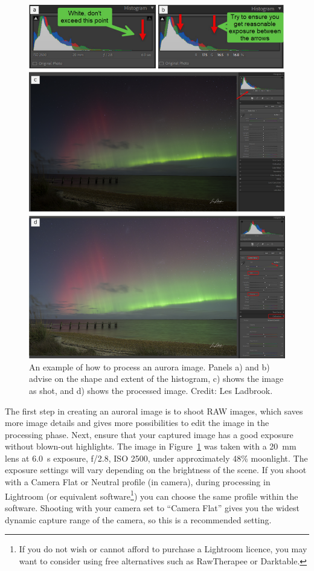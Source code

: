 \documentclass{article}
\begin{document}
\begin{figure}
  \includegraphics[width=\linewidth]{Fig14_ImageHistograms.png}
  \caption{An example of how to process an aurora image. Panels a) and b) advise on the shape and extent of the histogram, c) shows the image as shot, and d) shows the processed image. Credit: Les Ladbrook.}
  \label{fig-processing}
\end{figure}

The first step in creating an auroral image is to shoot RAW images, which saves more image details and gives more possibilities to edit the image in the processing phase. Next, ensure that your captured image has a good exposure without blown-out highlights. The image in Figure~\ref{fig-processing} was taken with a 20~mm lens at 6.0~s exposure, f/2.8, ISO 2500, under approximately 48\% moonlight. The exposure settings will vary depending on the brightness of the scene. If you shoot with a Camera Flat or Neutral profile (in camera), during processing in Lightroom (or equivalent software\footnote{If you do not wish or cannot afford to purchase a Lightroom licence, you may want to consider using free alternatives such as RawTherapee or Darktable.}) you can choose the same profile within the software.  Shooting with your camera set to ``Camera Flat'' gives you the widest dynamic capture range of the camera, so this is a recommended setting. 
\end{document}
